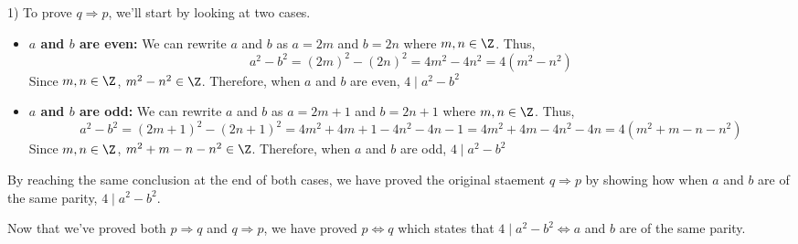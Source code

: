 \begin{paragraph}{1)}
        To prove $q \Rightarrow p$, we'll start by looking at two cases.

        \begin{itemize}
            \item{
                \textbf{$a$ and $b$ are even:} We can rewrite $a$ and $b$ as $a = 2m$ and 
                $b = 2n$ where $m, n \in \Z$. Thus,
                $$a^2 - b^2 = (2m)^2 - (2n)^2 = 4m^2 - 4n^2 = 4(m^2 - n^2)$$
                Since $m, n \in \Z$, $m^2 - n^2 \in \Z$. Therefore, 
                when $a$ and $b$ are even, $4 \mid a^2 - b^2$
            }

            \item{
                \textbf{$a$ and $b$ are odd:} We can rewrite $a$ and $b$ as $a = 2m + 1$ and 
                $b = 2n + 1$ where $m, n \in \Z$. Thus,
                $$a^2 - b^2 = (2m + 1)^2 - (2n + 1)^2 = 4m^2 +4m +1  - 4n^2 -4n -1 = 4m^2 + 4m - 4n^2 -4n = 4(m^2 + m - n - n^2)$$
                Since $m, n \in \Z$, $m^2 + m - n - n^2 \in \Z$. Therefore, 
                when $a$ and $b$ are odd, $4 \mid a^2 - b^2$
            }
        \end{itemize}
        
        By reaching the same conclusion at the end of both cases, we have proved the original staement 
        $q \Rightarrow p$ by showing how when $a$ and $b$ are of the same parity, $4 \mid a^2 - b^2$.
        \spacing

        Now that we've proved both $p \Rightarrow q$ and $q \Rightarrow p$, we have proved $p \iff q$
        which states that $4 \mid a^2 - b^2 \iff a$ and $b$ are of the same parity.
        
        \proofEnd
    \end{paragraph}

    \pagebreak

